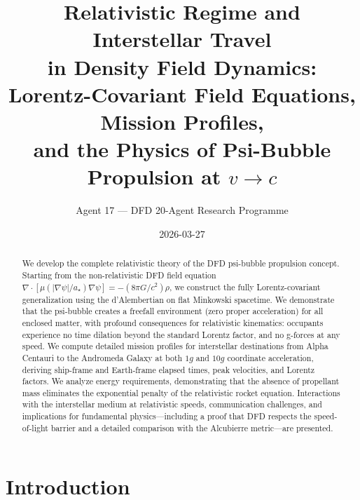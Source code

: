 \documentclass[aps,prd,twocolumn,superscriptaddress,nofootinbib]{revtex4-2}
\begin{document}
\title{Relativistic Regime and Interstellar Travel\\
in Density Field Dynamics:\\
Lorentz-Covariant Field Equations, Mission Profiles,\\
and the Physics of Psi-Bubble Propulsion at $v \to c$}

\author{Agent 17 --- DFD 20-Agent Research Programme}

\date{2026-03-27}

\begin{abstract}
We develop the complete relativistic theory of the DFD psi-bubble
propulsion concept.  Starting from the non-relativistic DFD field
equation $\nabla\cdot[\mu(|\nabla\psi|/a_\star)\nabla\psi]
= -(8\pi G/c^2)\rho$, we construct the fully Lorentz-covariant
generalization using the d'Alembertian on flat Minkowski spacetime.
We demonstrate that the psi-bubble creates a freefall environment
(zero proper acceleration) for all enclosed matter, with profound
consequences for relativistic kinematics: occupants experience no
time dilation beyond the standard Lorentz factor, and no g-forces
at any speed.  We compute detailed mission profiles for interstellar
destinations from Alpha Centauri to the Andromeda Galaxy at both
$1g$ and $10g$ coordinate acceleration, deriving ship-frame and
Earth-frame elapsed times, peak velocities, and Lorentz factors.
We analyze energy requirements, demonstrating that the absence of
propellant mass eliminates the exponential penalty of the
relativistic rocket equation.  Interactions with the interstellar
medium at relativistic speeds, communication challenges, and
implications for fundamental physics---including a proof that
DFD respects the speed-of-light barrier and a detailed comparison
with the Alcubierre metric---are presented.
\end{abstract}

\maketitle
\tableofcontents

\section{Introduction}\label{sec:intro}
\end{document}
